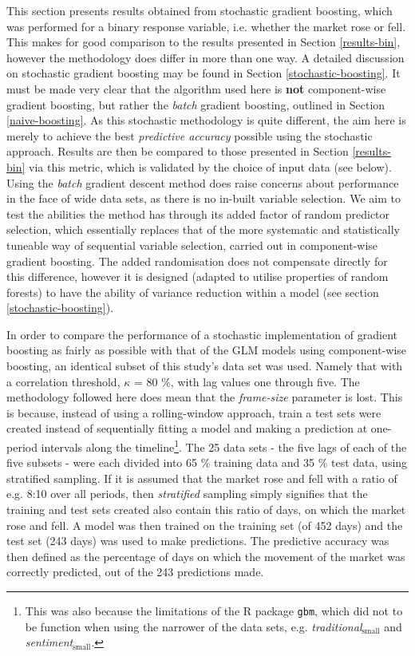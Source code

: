 \documentclass{article}
\begin{document}
This section presents results obtained from stochastic gradient boosting, which was performed for a binary response variable, i.e. whether the market rose or fell. This makes for good comparison to the results presented in Section \ref{results-bin}, however the methodology does differ in more than one way. A detailed discussion on stochastic gradient boosting may be found in Section \ref{stochastic-boosting}. It must be made very clear that the algorithm used here is \textbf{not} component-wise gradient boosting, but rather the \emph{batch} gradient boosting, outlined in Section \ref{naive-boosting}. As this stochastic methodology is quite different, the aim here is merely to achieve the best \emph{predictive accuracy} possible using the stochastic approach. Results are then be compared to those presented in Section \ref{results-bin} via this metric, which is validated by the choice of input data (see below). Using the \emph{batch} gradient descent method does raise concerns about performance in the face of wide data sets, as there is no in-built variable selection. We aim to test the abilities the method has through its added factor of random predictor selection, which essentially replaces that of the more systematic and statistically tuneable way of sequential variable selection, carried out in component-wise gradient boosting. The added randomisation does not compensate directly for this difference, however it is designed (adapted to utilise properties of random forests) to have the ability of variance reduction within a model (see section \ref{stochastic-boosting}).

In order to compare the performance of a stochastic implementation of gradient boosting as fairly as possible with that of the GLM models using component-wise boosting, an identical subset of this study's data set was used. Namely that with a correlation threshold, $\kappa$ = 80 \%, with lag values one through five. The methodology followed here does mean that the \emph{frame-size} parameter is lost. This is because, instead of using a rolling-window approach, train a test sets were created instead of sequentially fitting a model and making a prediction at one-period intervals along the timeline\footnote{This was also because the limitations of the R package \texttt{gbm}, which did not to be function when using the narrower of the data sets, e.g. \emph{traditional$_{\text{small}}$} and \emph{sentiment$_{\text{small}}$}.}. The 25 data sets - the five lags of each of the five subsets - were each divided into 65 \% training data and 35 \% test data, using stratified sampling. If it is assumed that the market rose and fell with a ratio of e.g. 8:10 over all periods, then \emph{stratified} sampling simply signifies that the training and test sets created also contain this ratio of days, on which the market rose and fell. A model was then trained on the training set (of 452 days) and the test set (243 days) was used to make predictions. The predictive accuracy was then defined as the percentage of days on which the movement of the market was correctly predicted, out of the 243 predictions made.
\end{document}
